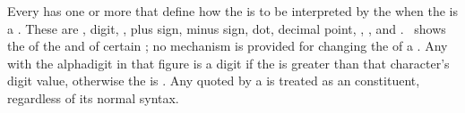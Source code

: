 
Every  has one or more 
that define how the  is to be interpreted by the 
when the  is a  .
These  are 
     ,                  
     digit,
     ,
     plus sign,
     minus sign, 
     dot,
     decimal point,
     ,
     ,
 and .
\Figref\ConstituentTraitsOfStdChars\ shows the 
of the 
and of certain  ;
no mechanism is provided for changing the  of a .
Any  with the alphadigit 
in that figure is a digit if the  is greater
than that character's digit value,
otherwise the  is .  
Any  quoted by a  
is treated as an  constituent, regardless of its normal syntax.

                   
